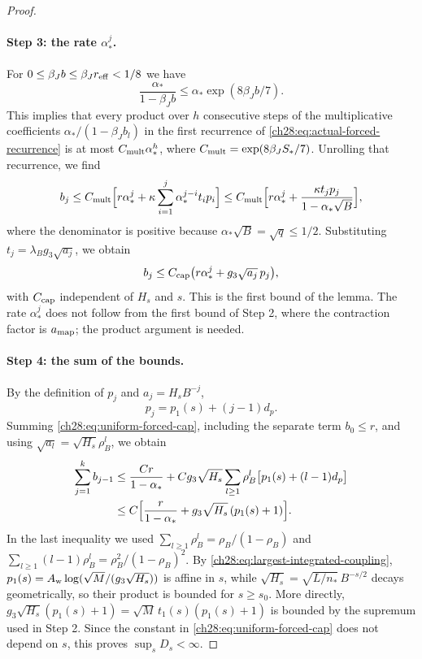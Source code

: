 \begin{proof}
\paragraph{Step 3: the rate $\alpha_*^j$.}
For $0\le\beta_Jb\le\beta_Jr_{\rm eff}<1/8$ we have
\[
 \frac{\alpha_*}{1-\beta_Jb}\le\alpha_*\exp(8\beta_Jb/7).
\]
This implies that every product over $h$ consecutive steps of the multiplicative coefficients $\alpha_*/(1-\beta_Jb_l)$ in the first recurrence of \eqref{ch28:eq:actual-forced-recurrence} is at most $C_{\rm mult}\alpha_*^h$, where $C_{\rm mult}=\exp(8\beta_JS_*/7)$. Unrolling that recurrence, we find
\[
 b_j\le C_{\rm mult}\Bigl[r\alpha_*^j+\kappa\sum_{i=1}^j\alpha_*^{j-i}t_ip_i\Bigr]\le C_{\rm mult}\Bigl[r\alpha_*^j+\frac{\kappa t_jp_j}{1-\alpha_*\sqrt B}\Bigr],
\]
where the denominator is positive because $\alpha_*\sqrt B=\sqrt q\le1/2$. Substituting $t_j=\lambda_Bg_3\sqrt{a_j}$, we obtain
\begin{equation}\label{ch28:eq:uniform-forced-cap}
 b_j\le C_{\rm cap}\bigl(r\alpha_*^j+g_3\sqrt{a_j}\,p_j\bigr),
\end{equation}
with $C_{\rm cap}$ independent of $H_s$ and $s$. This is the first bound of the lemma. The rate $\alpha_*^j$ does not follow from the first bound of Step 2, where the contraction factor is $a_{\rm map}$; the product argument is needed.

\paragraph{Step 4: the sum of the bounds.}
By the definition of $p_j$ and $a_j=H_sB^{-j}$,
\begin{equation}\label{ch28:eq:affine-white-cut}
 p_j=p_1(s)+(j-1)d_p.
\end{equation}
Summing \eqref{ch28:eq:uniform-forced-cap}, including the separate term $b_0\le r$, and using $\sqrt{a_l}=\sqrt{H_s}\rho_B^l$, we obtain
\begin{align*}
 \sum_{j=1}^kb_{j-1}&\le\frac{Cr}{1-\alpha_*}+Cg_3\sqrt{H_s}\sum_{l\ge1}\rho_B^l\bigl[p_1(s)+(l-1)d_p\bigr]\\
 &\le C\Bigl[\frac r{1-\alpha_*}+g_3\sqrt{H_s}\,(p_1(s)+1)\Bigr].
\end{align*}
In the last inequality we used $\sum_{l\ge1}\rho_B^l=\rho_B/(1-\rho_B)$ and $\sum_{l\ge1}(l-1)\rho_B^l=\rho_B^2/(1-\rho_B)^2$. By \eqref{ch28:eq:largest-integrated-coupling}, $p_1(s)=A_{\rm w}\log(\sqrt M/(g_3\sqrt{H_s}))$ is affine in $s$, while $\sqrt{H_s}=\sqrt{L/n_*}\,B^{-s/2}$ decays geometrically, so their product is bounded for $s\ge s_0$. More directly, $g_3\sqrt{H_s}(p_1(s)+1)=\sqrt M\,t_1(s)(p_1(s)+1)$ is bounded by the supremum used in Step 2. Since the constant in \eqref{ch28:eq:uniform-forced-cap} does not depend on $s$, this proves $\sup_sD_s<\infty$.


\end{proof}
